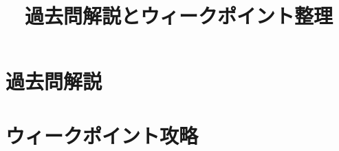 \documentclass[a4paper,11pt]{jlreq}
\title{過去問解説とウィークポイント整理}
\author{}
\date{}
\begin{document}
\maketitle

\section*{過去問解説}


\newpage

\section*{ウィークポイント攻略}

\end{document}
